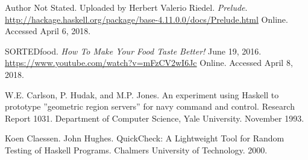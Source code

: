 \documentclass[11pt]{article}
\begin{document}
\begin{thebibliography}{13}
        Author Not Stated. Uploaded by Herbert Valerio Riedel. \textit{Prelude}.
        \url{http://hackage.haskell.org/package/base-4.11.0.0/docs/Prelude.html}
        Online. Accessed April 6, 2018.

        SORTEDfood. \textit{How To Make Your Food Taste Better!} June 19, 2016.
        \url{https://www.youtube.com/watch?v=mFzCV2wI6Jc}
        Online. Accessed April 8, 2018.

        W.E. Carlson, P. Hudak, and M.P. Jones. An experiment using
        Haskell to prototype ”geometric region servers” for navy command
        and control. Research Report 1031. Department of Computer Science,
        Yale University. November 1993.

        Koen Claessen. John Hughes. QuickCheck: A Lightweight Tool for
        Random Testing of Haskell Programs. Chalmers University of Technology.
        2000.

    \end{thebibliography}   

    \newpage

    \appendix
\end{document}
